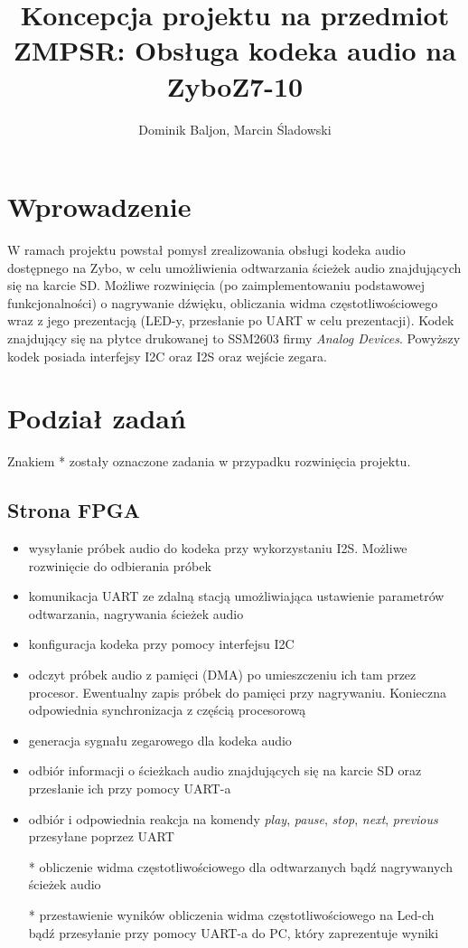 \documentclass[a4paper, 12pt]{article}
\title{\Huge{Koncepcja projektu na przedmiot ZMPSR: Obsługa kodeka audio na ZyboZ7-10}}
\author{Dominik Baljon, Marcin Śladowski}
\date{}
\begin{document}
\maketitle

\section{Wprowadzenie}
W ramach projektu powstał pomysł zrealizowania obsługi kodeka audio dostępnego na Zybo, w celu umożliwienia odtwarzania ścieżek audio znajdujących się na karcie SD. Możliwe rozwinięcia (po zaimplementowaniu podstawowej funkcjonalności) o nagrywanie dźwięku, obliczania widma częstotliwościowego wraz z jego prezentacją (LED-y, przesłanie po UART w celu prezentacji).
Kodek znajdujący się na płytce drukowanej to SSM2603 firmy \textit{Analog Devices}. Powyższy kodek posiada interfejsy I2C oraz I2S oraz wejście zegara.

\section{Podział zadań}
Znakiem * zostały oznaczone zadania w przypadku rozwinięcia projektu.
\subsection{Strona FPGA}
\begin{itemize}
	\item wysyłanie próbek audio do kodeka przy wykorzystaniu I2S. Możliwe rozwinięcie do odbierania próbek
	\item komunikacja UART ze zdalną stacją umożliwiająca ustawienie parametrów odtwarzania, nagrywania ścieżek audio
	\item konfiguracja kodeka przy pomocy interfejsu I2C
	\item odczyt próbek audio z pamięci (DMA) po umieszczeniu ich tam przez procesor. Ewentualny zapis próbek do pamięci przy nagrywaniu. Konieczna odpowiednia synchronizacja z częścią procesorową
	\item generacja sygnału zegarowego dla kodeka audio
	\item odbiór informacji o ścieżkach audio znajdujących się na karcie SD oraz przesłanie ich przy pomocy UART-a
	\item odbiór i odpowiednia reakcja na komendy \textit{play}, \textit{pause}, \textit{stop}, \textit{next}, \textit{previous} przesyłane poprzez UART
	\item[*] obliczenie widma częstotliwościowego dla odtwarzanych bądź nagrywanych ścieżek audio
	\item[*] przestawienie wyników obliczenia widma częstotliwościowego na Led-ch bądź przesyłanie przy pomocy UART-a do PC, który zaprezentuje wyniki
\end{itemize}
\end{document}
